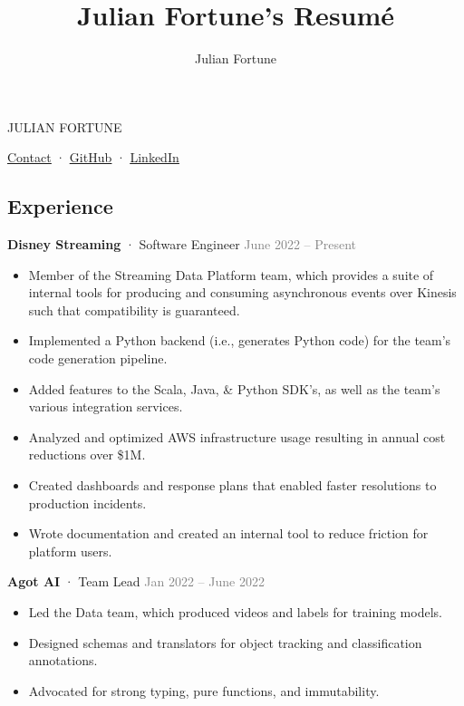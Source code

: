 \documentclass[11pt]{article} %
\title{Julian Fortune's Resumé}
\author{Julian Fortune}
\providecommand{\tightlist}{%
  \setlength{\itemsep}{0pt}\setlength{\parskip}{3pt}}
\let\defaultref\href
\renewcommand{\href}[2]{%
  \defaultref{#1}{\ul{#2}}%
}
\newcommand{\link}[2]{\href{#1}{#2}}
\def\separator{ · {}}
\newcommand{\experience}[3]{%
  \vspace{5pt}%
  \textbf{#1}\separator#2\hfill%
  \textcolor{gray}{#3}%
}
\begin{document}
\begin{bfseries}\begin{huge}
  {\selectfont%
    \MakeTextUppercase{Julian Fortune}
  }
\end{huge}\end{bfseries}

  \link{https://julianfortune.com}{Contact}\separator%
    \link{http://github.com/julianfortune}{GitHub}\separator%
\link{http://linkedin.com/in/julianfortune}{LinkedIn}%

%
\begin{paracol}{2}
\begin{raggedright}

\hypertarget{experience}{%
\section{Experience}\label{experience}}

\experience{Disney Streaming}{Software Engineer}{June 2022 -- Present}

\begin{itemize}
\tightlist
\item
  Member of the Streaming Data Platform team, which provides a suite of
  internal tools for producing and consuming asynchronous events over
  Kinesis such that compatibility is guaranteed.
\item
  Implemented a Python backend (i.e., generates Python code) for the
  team's code generation pipeline.
\item
  Added features to the Scala, Java, \& Python SDK's, as well as the
  team's various integration services.
\item
  Analyzed and optimized AWS infrastructure usage resulting in annual
  cost reductions over \$1M.
\item
  Created dashboards and response plans that enabled faster resolutions
  to production incidents.
\item
  Wrote documentation and created an internal tool to reduce friction
  for platform users.
\end{itemize}

\experience{Agot AI}{Team Lead}{Jan 2022 -- June 2022}

\begin{itemize}
\tightlist
\item
  Led the Data team, which produced videos and labels for training
  models.
\item
  Designed schemas and translators for object tracking and
  classification annotations.
\item
  Advocated for strong typing, pure functions, and immutability.
\end{itemize}


\end{raggedright}
\end{paracol}
\end{document}
